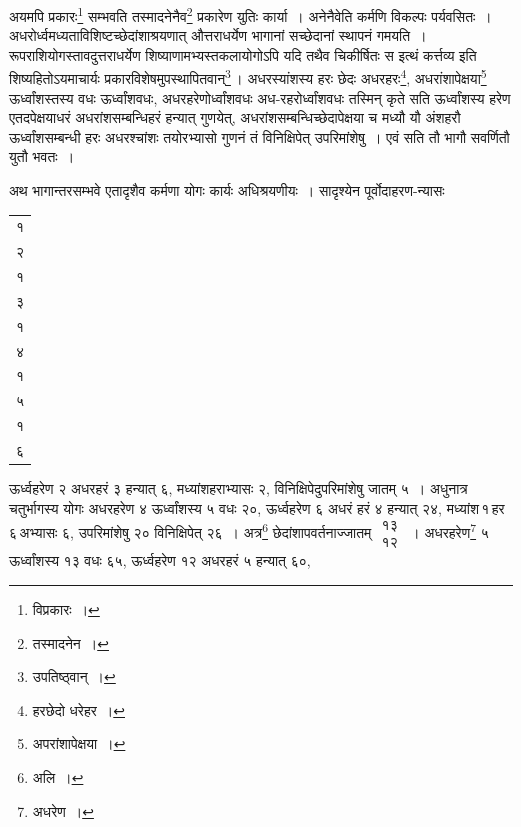 \documentclass[10pt, openany]{book}
\begin{document}
{अयमपि प्रकारः\renewcommand{\thefootnote}{\s ५}\footnote{\s विप्रकारः~।} सम्भवति तस्मादनेनैव\renewcommand{\thefootnote}{\s ६}\footnote{\s तस्मादनेन~।}  प्रकारेण युतिः कार्या~।
अनेनैवेति कर्मणि}
{विकल्पः पर्यवसितः~। अधरोर्ध्वमध्यताविशिष्टच्छेदांशाश्रयणात्
औत्तराधर्येण भागानां सच्छेदानां स्थापनं गमयति~। रूपराशियोगस्तावदुत्तराधर्येण
शिष्याणामभ्यस्तकलायोगोऽपि यदि}
{तथैव चिकीर्षितः स इत्थं कर्त्तव्य इति शिष्यहितोऽयमाचार्यः
प्रकारविशेषमुपस्थापितवान्\renewcommand{\thefootnote}{\s ७}\footnote{\s उपतिष्ठ्वान्~।}\,। अधरस्यांशस्य हरः छेदः अधरहरः\renewcommand{\thefootnote}{\s ८}\footnote{\s हरछेदो धरेहर~।}, अधरांशापेक्षया\renewcommand{\thefootnote}{\s ९}\footnote{\s अपरांशापेक्षया~।} 
ऊर्ध्वांशस्तस्य वधः}
{ऊर्ध्वांशवधः, अधरहरेणोर्ध्वांशवधः अध-रहरोर्ध्वांशवधः तस्मिन् कृते
सति ऊर्ध्वांशस्य}
{हरेण एतदपेक्षयाधरं अधरांशसम्बन्धिहरं हन्यात् गुणयेत्,
अधरांशसम्बन्धिच्छेदापेक्षया}
{च मध्यौ यौ अंशहरौ ऊर्ध्वांशसम्बन्धी हरः अधरश्चांशः तयोरभ्यासो
गुणनं तं विनिक्षिपेत्}
{उपरिमांशेषु~। एवं सति तौ भागौ सवर्णितौ युतौ भवतः~।}
\vspace{3mm}

{अथ भागान्तरसम्भवे एतादृशैव कर्मणा योगः कार्यः अधिश्रयणीयः~। सादृश्येन पूर्वोदाहरण-न्यासः\textemdash}  

\hspace{20mm} \begin{tabular} {|c|}
१\\
२ \\
१\\
 ३ \\
 १\\
 ४\\
 १\\
 ५\\
 १\\
 ६\end{tabular}
\vspace{-1mm}

{ऊर्ध्वहरेण २ अधरहरं ३ हन्यात् ६, मध्यांशहराभ्यासः २,
विनिक्षिपेदुपरिमांशेषु जातम् ५~।}
{अधुनात्र चतुर्भागस्य योगः अधरहरेण ४ ऊर्ध्वांशस्य ५ वधः २०,
ऊर्ध्वहरेण ६ अधरं हरं ४}
{हन्यात् २४, मध्यांश\textendash \,१\textendash \,हर\textendash \,६\textendash \,अभ्यासः ६, उपरिमांशेषु २० विनिक्षिपेत्
२६~।}
{अत्र\renewcommand{\thefootnote}{\s १०}\footnote{\s अलि~।}  छेदांशापवर्तनाज्जातम् $\begin{matrix}

\mbox{{१३}}\\

\mbox{{१२}}

\end{matrix}$~। अधरहरेण\renewcommand{\thefootnote}{\s ११}\footnote{\s अधरेण~।}  ५
ऊर्ध्वांशस्य १३ वधः ६५, ऊर्ध्वहरेण १२ अधरहरं ५ हन्यात् ६०,}
\end{document}
